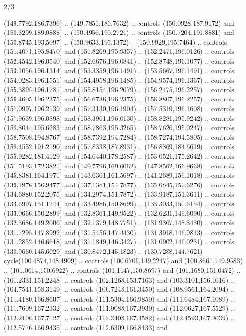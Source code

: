 \begin{flagdescription}{2/3}
\begin{scope}[shift={(0.5\flaglength,0.5)},scale=\flagwidth/320]
\begin{scope}[y=0.8pt, x=0.8pt, yscale=-1,shift={(-118.3,-146)}]
  (149.7792,186.7396) .. (149.7851,186.7632) .. controls (150.0928,187.9172) and
  (150.3299,189.0888) .. (150.4956,190.2724) .. controls (150.7204,191.8881) and
  (150.8745,193.5097) .. (150.9633,195.1372) -- (150.9929,195.7464) .. controls
  (151.4071,195.8470) and (151.8269,195.9357) .. (152.2471,196.0126) .. controls
  (152.4542,196.0540) and (152.6676,196.0841) .. (152.8748,196.1077) .. controls
  (153.1056,196.1314) and (153.3359,196.1491) .. (153.5667,196.1491) .. controls
  (154.0283,196.1551) and (154.4958,196.1485) .. (154.9574,196.1367) .. controls
  (155.3895,196.1781) and (155.8154,196.2079) .. (156.2475,196.2257) .. controls
  (156.4605,196.2375) and (156.6736,196.2375) .. (156.8807,196.2257) .. controls
  (157.0997,196.2139) and (157.3130,196.1904) .. (157.5319,196.1608) .. controls
  (157.9639,196.0898) and (158.3961,196.0130) .. (158.8281,195.9242) .. controls
  (158.8044,195.6283) and (158.7863,195.3265) .. (158.7626,195.0247) .. controls
  (158.7508,194.8767) and (158.7392,194.7284) .. (158.7274,194.5805) .. controls
  (158.4552,191.2190) and (157.8338,187.8931) .. (156.8869,184.6619) .. controls
  (155.9282,181.4129) and (154.6440,178.2587) .. (153.0521,175.2642) .. controls
  (151.5193,172.3821) and (149.7796,169.6062) .. (147.8562,166.9668) .. controls
  (145.8381,164.1971) and (143.6361,161.5697) .. (141.2689,159.1018) .. controls
  (139.1976,156.9477) and (137.1381,154.7877) .. (135.0845,152.6276) .. controls
  (134.6880,152.2075) and (134.2974,151.7872) .. (133.9187,151.3611) .. controls
  (133.6997,151.1244) and (133.4986,150.8699) .. (133.3033,150.6154) .. controls
  (133.0666,150.2899) and (132.8361,149.9522) .. (132.6231,149.6090) .. controls
  (132.3686,149.2006) and (132.1379,148.7751) .. (131.9367,148.3430) .. controls
  (131.7295,147.8992) and (131.5456,147.4430) .. (131.3918,146.9813) .. controls
  (131.2852,146.6618) and (131.1849,146.3427) .. (131.0902,146.0231) .. controls
  (130.9660,145.6029) and (130.8472,145.1823) .. (130.7288,144.7621) --
  cycle(100.4874,148.4909) .. controls (100.6709,149.2247) and
  (100.8661,149.9583) .. (101.0614,150.6922) .. controls (101.1147,150.8697) and
  (101.1680,151.0472) .. (101.2331,151.2248) .. controls (102.1268,153.7163) and
  (103.3101,156.1016) .. (104.7541,158.3149) .. controls (106.7248,161.3450) and
  (108.9561,164.2094) .. (111.4180,166.8607) .. controls (111.5304,166.9850) and
  (111.6484,167.1089) .. (111.7609,167.2332) .. controls (111.9088,167.3930) and
  (112.0627,167.5529) .. (112.2106,167.7127) .. controls (112.3408,167.4582) and
  (112.4593,167.2039) .. (112.5776,166.9435) .. controls (112.6309,166.8133) and

\end{scope}
\end{scope}
\end{flagdescription}
